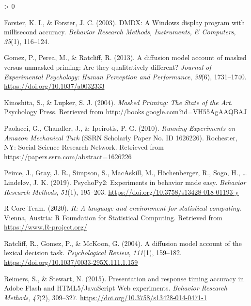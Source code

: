\documentclass[
  english,
  man]{apa6}
\newlength{\cslhangindent}
\newenvironment{CSLReferences}[2] %
 {%
  \setlength{\parindent}{0pt}
  \ifodd #1 \everypar{\setlength{\hangindent}{\cslhangindent}}\ignorespaces\fi
  \ifnum #2 > 0
  \setlength{\parskip}{#2\baselineskip}
  \fi
 }%
 {}
\begin{document}
\begin{CSLReferences}{1}{0}
\leavevmode\hypertarget{ref-forsterDMDXWindowsDisplay2003}{}%
Forster, K. I., \& Forster, J. C. (2003). {DMDX}: {A Windows} display program with millisecond accuracy. \emph{Behavior Research Methods, Instruments, \& Computers}, \emph{35}(1), 116--124.

\leavevmode\hypertarget{ref-gomezDiffusionModelAccount2013}{}%
Gomez, P., Perea, M., \& Ratcliff, R. (2013). A diffusion model account of masked versus unmasked priming: {Are} they qualitatively different? \emph{Journal of Experimental Psychology: Human Perception and Performance}, \emph{39}(6), 1731--1740. \url{https://doi.org/10.1037/a0032333}

\leavevmode\hypertarget{ref-kinoshitaMaskedPrimingState2004}{}%
Kinoshita, S., \& Lupker, S. J. (2004). \emph{Masked {Priming}: {The State} of the {Art}}. {Psychology Press}. Retrieved from \url{http://books.google.com?id=VH55AgAAQBAJ}

\leavevmode\hypertarget{ref-paolacciRunningExperimentsAmazon2010}{}%
Paolacci, G., Chandler, J., \& Ipeirotis, P. G. (2010). \emph{Running {Experiments} on {Amazon Mechanical Turk}} (SSRN Scholarly Paper No. ID 1626226). {Rochester, NY}: {Social Science Research Network}. Retrieved from \url{https://papers.ssrn.com/abstract=1626226}

\leavevmode\hypertarget{ref-peirce2019}{}%
Peirce, J., Gray, J. R., Simpson, S., MacAskill, M., Höchenberger, R., Sogo, H., \ldots{} Lindeløv, J. K. (2019). PsychoPy2: Experiments in behavior made easy. \emph{Behavior Research Methods}, \emph{51}(1), 195--203. \url{https://doi.org/10.3758/s13428-018-01193-y}

\leavevmode\hypertarget{ref-R-base}{}%
R Core Team. (2020). \emph{R: A language and environment for statistical computing}. Vienna, Austria: R Foundation for Statistical Computing. Retrieved from \url{https://www.R-project.org/}

\leavevmode\hypertarget{ref-ratcliff2004}{}%
Ratcliff, R., Gomez, P., \& McKoon, G. (2004). A diffusion model account of the lexical decision task. \emph{Psychological Review}, \emph{111}(1), 159--182. \url{https://doi.org/10.1037/0033-295X.111.1.159}

\leavevmode\hypertarget{ref-reimersPresentationResponseTiming2015}{}%
Reimers, S., \& Stewart, N. (2015). Presentation and response timing accuracy in {Adobe Flash} and {HTML5}/{JavaScript Web} experiments. \emph{Behavior Research Methods}, \emph{47}(2), 309--327. \url{https://doi.org/10.3758/s13428-014-0471-1}


\end{CSLReferences}
\end{document}

